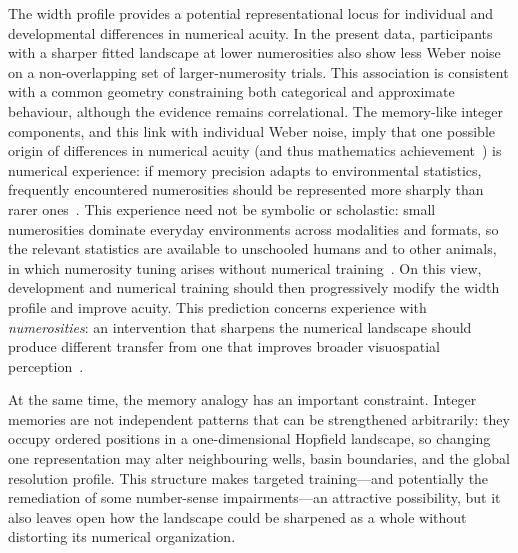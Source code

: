 \documentclass[Afour,sageh,times]{sagej}
\newif\ifmarkrevisions
\newcommand{\revised}[1]{\ifmarkrevisions{\color{red}#1}\else#1\fi}
\begin{document}
The width profile provides a potential representational locus for individual and developmental differences in numerical acuity. In the present data, participants with a sharper fitted landscape at lower numerosities also show less Weber noise on a non-overlapping set of larger-numerosity trials. This association is consistent with a common geometry constraining both categorical and approximate behaviour, although the evidence remains correlational. The memory-like integer components, and this link with individual Weber noise, imply that one possible origin of differences in numerical acuity (and thus mathematics achievement~\citep{halberda_individual_2008}) is numerical experience: if memory precision adapts to environmental statistics, frequently encountered \revised{numerosities} should be represented more sharply than rarer ones~\citep{anderson_reflections_1991,verguts_representation_2004}. \revised{This experience need not be symbolic or scholastic: small numerosities dominate everyday environments across modalities and formats, so the relevant statistics are available to unschooled humans and to other animals, in which numerosity tuning arises without numerical training~\citep{viswanathan_neuronal_2013}. On this view, development} and numerical training should then progressively modify the width profile and improve acuity. \revised{This prediction concerns experience with \emph{numerosities}:} an intervention that sharpens the numerical landscape should produce different transfer from one that improves broader visuospatial perception~\citep{butterworth_investigating_2017}.

At the same time, the memory analogy has an important constraint. Integer memories are not independent patterns that can be strengthened arbitrarily: they occupy ordered positions in a one-dimensional Hopfield landscape, so changing one representation may alter neighbouring wells, basin boundaries, and the global resolution profile. This structure makes targeted training---and potentially the remediation of some number-sense impairments---an attractive possibility, but it also leaves open how the landscape could be sharpened as a whole without distorting its numerical organization. 
\end{document}
